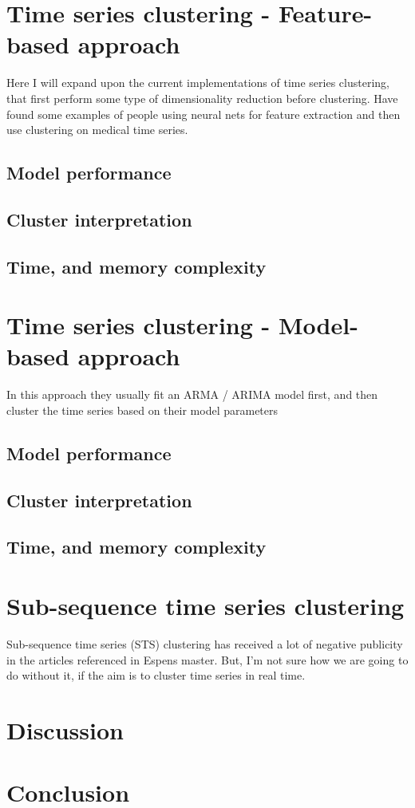 \documentclass[12pt,english,a4paper,openright]{article}
\begin{document}
\section{Time series clustering - Feature-based approach}
Here I will expand upon the current implementations of time series clustering, that first perform some type of dimensionality reduction before clustering. Have found some examples of people using neural nets for feature extraction and then use clustering on medical time series.

\subsection{Model performance}

\subsection{Cluster interpretation}

\subsection{Time, and memory complexity}

\section{Time series clustering - Model-based approach}
In this approach they usually fit an ARMA / ARIMA model first, and then cluster the time series based on their model parameters

\subsection{Model performance}

\subsection{Cluster interpretation}

\subsection{Time, and memory complexity}

\section{Sub-sequence time series clustering}
Sub-sequence time series (STS) clustering has received a lot of negative publicity in the articles referenced in Espens master. But, I'm not sure how we are going to do without it, if the aim is to cluster time series in real time.

\section{Discussion}

\section{Conclusion}

\printbibliography
\end{document}
